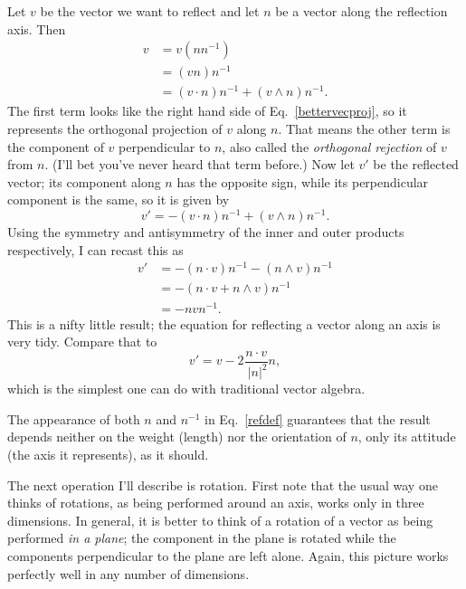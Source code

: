 \documentclass{utarticle}
\DeclareMathOperator{\inp}{\cdot}
\DeclareMathOperator{\out}{\wedge}
\begin{document}
Let $v$ be the vector we want to reflect and let $n$ be a vector
along the reflection axis.  Then
\begin{align} 
v & = v (nn^{-1}) \nonumber \\
  & = (v n)n^{-1} \nonumber \\
  & = (v \inp n) n^{-1} + (v \out n) n^{-1}. 
\label{vectordecomp}
\end{align} 
The first term looks like the right hand side of Eq.~\eqref{bettervecproj}, so it represents 
the orthogonal projection of $v$ along $n$.  That means the other 
term is the component of $v$ perpendicular to $n$, also called the \emph{orthogonal 
rejection} of $v$ from $n$.  (I'll bet you've never heard that term before.)  
Now let $v'$ be the reflected vector; its component along $n$ has the opposite 
sign, while its perpendicular component is the same, so it is given by
\begin{equation}
v' = -(v \inp n) n^{-1} + (v \out n) n^{-1}.
\end{equation}
Using the symmetry and antisymmetry of the inner and outer products respectively, 
I can recast this as
\begin{align}
v' & = -(n \inp v) n^{-1} - (n \out v) n^{-1} \nonumber \\
    & = -(n \inp v + n \out v) n^{-1} \nonumber \\
    & = -n v n^{-1}.
\label{refdef}
\end{align}
This is a nifty little result; the equation for reflecting a vector along an axis is very tidy.  
Compare that to
\begin{equation} v' = v - 2\frac{n \inp v}{\ |n|^2}n, \end{equation}
which is the simplest one can do with traditional vector algebra.

The appearance of both $n$ and $n^{-1}$ in Eq.~\eqref{refdef} guarantees 
that the result depends neither on the weight (length) nor the orientation of 
$n$, only its attitude (the axis it represents), as it should.

The next operation I'll describe is rotation. First note that the usual 
way one thinks of rotations, as being performed around an axis, works 
only in three dimensions.  In general, it is better to think of a rotation of a
vector as being performed \emph{in a plane}; the component in
the plane is rotated while the components perpendicular to the plane
are left alone.  Again, this picture works perfectly well in any
number of dimensions.
\end{document}
